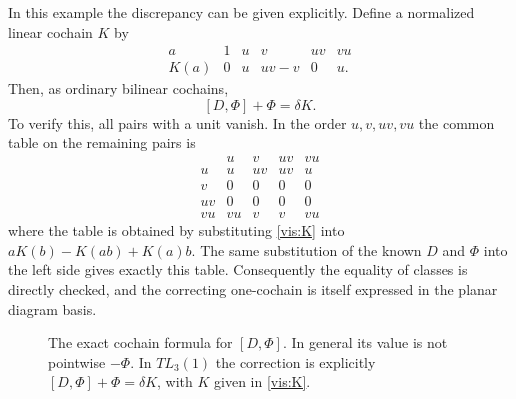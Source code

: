 \documentclass[a4paper,11pt,oneside,reqno]{amsart}
\theoremstyle{definition}
\numberwithin{equation}{section}
\begin{document}
In this example the discrepancy can be given explicitly. Define a
normalized linear cochain $K$ by
\begin{equation}\label{vis:K}
 \begin{array}{c|ccccc}
 a&1&u&v&uv&vu\\\hline
 K(a)&0&u&uv-v&0&u.
 \end{array}
\end{equation}
Then, as ordinary bilinear cochains,
\begin{equation}\label{vis:Kidentity}
 \boxed{[D,\Phi]+\Phi=\delta K.}
\end{equation}
To verify this, all pairs with a unit vanish. In the order
$u,v,uv,vu$ the common table on the remaining pairs is
\[
 \begin{array}{c|cccc}
 &u&v&uv&vu\\\hline
 u&u&uv&uv&u\\
 v&0&0&0&0\\
 uv&0&0&0&0\\
 vu&vu&v&v&vu
 \end{array}
\]
where the table is obtained by substituting \eqref{vis:K} into
$aK(b)-K(ab)+K(a)b$. The same substitution of the known $D$ and
$\Phi$ into the left side gives exactly this table.
Consequently the equality of classes is directly checked, and the
correcting one-cochain is itself expressed in the planar diagram basis.
\begin{figure}[htbp]
\centering
{}
\caption{The exact cochain formula for $[D,\Phi]$. In general its value is not pointwise $-\Phi$. In $TL_3(1)$ the correction is explicitly $[D,\Phi]+\Phi=\delta K$, with $K$ given in \eqref{vis:K}.}
\label{fig:vis-bracket}
\end{figure}
\end{document}
